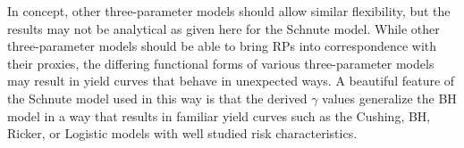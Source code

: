 %
In concept, other three-parameter models should allow similar flexibility, but 
the results may not be analytical as given here for the Schnute model. While 
other three-parameter models should be able to bring RPs into correspondence 
with their proxies, the differing functional forms of various three-parameter 
models may result in yield curves that behave in unexpected ways. A beautiful 
feature of the Schnute model used in this way is that the derived $\gamma$ 
values generalize the BH model in a way that results in familiar yield curves 
such as the Cushing, BH, Ricker, or Logistic models with well studied risk 
characteristics. 


